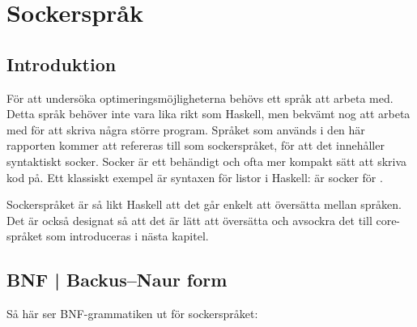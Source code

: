 \documentclass[Rapport]{subfiles}
\begin{document}
\section{Sockerspråk}

%
%
%
%
%
%
%

%

\subsection{Introduktion}

För att undersöka optimeringsmöjligheterna behövs ett språk att arbeta med. 
Detta språk behöver inte vara lika rikt som Haskell, men bekvämt nog
att arbeta med för att skriva några större program. Språket som används i den
här rapporten kommer att refereras till som sockerspråket, för att det 
innehåller syntaktiskt socker. Socker är ett behändigt och ofta mer kompakt sätt 
att skriva kod på. Ett klassiskt exempel är syntaxen
för listor i Haskell: \miniCode{[5,0,4]} är socker för .

Sockerspråket är så likt Haskell att det går enkelt att översätta mellan språken.
Det är också designat så att det är lätt att översätta och avsockra det till 
core-språket som introduceras i nästa kapitel. 

\subsection{BNF | Backus–Naur form}

Så här ser BNF-grammatiken ut för sockerspråket:
\end{document}

